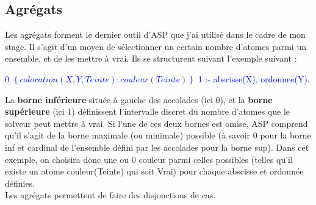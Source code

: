 \documentclass[12pt,a4paper]{article}
\begin{document}
\subsection{Agrégats}
Les agrégats forment le dernier outil d'ASP que j'ai utilisé dans le cadre de mon stage. Il s'agit d'un moyen de sélectionner un certain nombre d'atomes parmi un ensemble, et de les mettre à vrai. Ils se 
structurent suivant l'exemple suivant :
\begin{center}
\textcolor{blue}{
  0 $\left\{ coloration(X, Y, Teinte):couleur(Teinte)\right\}$ 1 :- abscisse(X), ordonnee(Y).
}
\end{center}
La \textbf{borne inférieure} située à gauche des accolades (ici 0), et la \textbf{borne supérieure} (ici 1) définissent l'intervalle discret du nombre d'atomes que le solveur peut mettre à vrai. Si l'une de ces deux bornes est 
omise, ASP comprend qu'il s'agit de la borne maximale (ou minimale) possible (à savoir 0 pour la borne inf et cardinal de l'ensemble défini par les accolades pour la borne sup). Dans cet exemple, on choisira donc une ou 0 
couleur parmi celles possibles (telles qu'il existe un atome couleur(Teinte) qui soit Vrai) pour chaque abscisse et ordonnée définies.\\
Les agrégats permettent de faire des disjonctions de cas.
\end{document}
